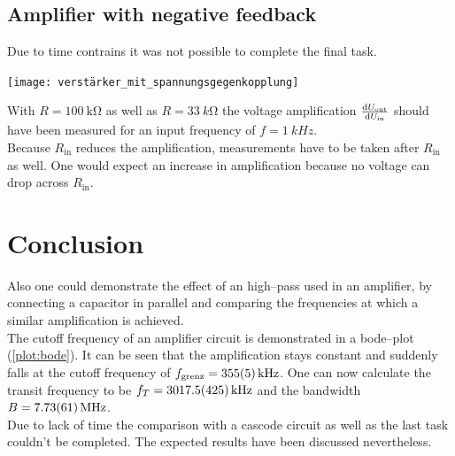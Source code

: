 \documentclass[a4paper,10pt]{article}
\newenvironment{Figure}
  {\par\medskip\noindent\minipage{\linewidth}}
  {\endminipage\par\medskip} %
\numberwithin{equation}{section}
\begin{document}
\begin{multicols}{2}
        \subsection{Amplifier with negative feedback}
        Due to time contrains it was not possible to complete the final task.
        \begin{Figure}
                \centering
                \texttt{[image: verstärker\_mit\_spannungsgegenkopplung]}
        \end{Figure}
        With $R=\SI{100}{\kilo\ohm}$ as well as $R=\SI{33}{k\ohm}$ the voltage amplification $\diff[]{U_\text{out}}{U_\text{in}}$ should have been measured for an input frequency of $f=\SI{1}{kHz}$.
        \\\indent Because $R_\text{in}$ reduces the amplification, measurements have to be taken after $R_\text{in}$ as well.
        One would expect an increase in amplification because no voltage can drop across $R_\text{in}$.

        \section{Conclusion}
        Also one could demonstrate the effect of an high--pass used in an amplifier, by connecting a capacitor in parallel and comparing the frequencies at which a similar amplification is achieved.
        \\\indent The cutoff frequency of an amplifier circuit is demonstrated in a bode--plot (\ref{plot:bode}).
        It can be seen that the amplification stays constant and suddenly falls at the cutoff frequency of $f_\text{grenz}=\SI{355+-5}{kHz}$.
        One can now calculate the transit frequency to be $f_T=\SI{3017.5+-42.5}{kHz}$ and the bandwidth $B=\SI{7.73+-0.61}{MHz}$.
        \\\indent Due to lack of time the comparison with a cascode circuit as well as the last task couldn't be completed.
        The expected results have been discussed nevertheless.

\end{multicols}

\clearpage
\listoffigures
\listoftables



\end{document}
